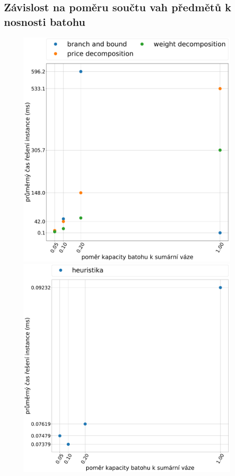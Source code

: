 \documentclass[11pt]{article}
\begin{document}
\subsection{Závislost na poměru součtu vah předmětů k nosnosti batohu}
\begin{figure}
	\centering
    \begin{minipage}[c]{0.49\textwidth}
        \centering\includegraphics[width=\textwidth]{img/mE.pdf} 
    \end{minipage}
    \begin{minipage}[c]{0.49\textwidth}
        \centering \includegraphics[width=\textwidth]{img/mH.pdf} 

\end{minipage}
\end{figure}
\end{document}
